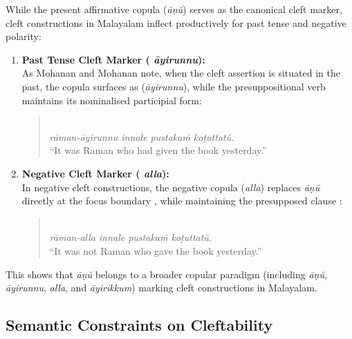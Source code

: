 While the present affirmative copula  (\textit{āṇŭ}) serves as the canonical cleft marker, cleft constructions in Malayalam inflect productively for past tense and negative polarity:
\begin{enumerate}[label=\textbf{\arabic*.}]
    \item \textbf{Past Tense Cleft Marker ( \textit{āyirunnu}):}\\
    As Mohanan and Mohanan \citep[fn.~3]{mohanan1999two} note, when the cleft assertion is situated in the past, the copula surfaces as  (\textit{āyirunnu}), while the presuppositional verb maintains its nominalised participial form:
    \begin{quote}
    \\
    \textit{rāman-āyirunnu innale pustakaṁ koṭuttatŭ.}\\
    ``It was Raman who had given the book yesterday.''
    \end{quote}

    \item \textbf{Negative Cleft Marker ( \textit{alla}):}\\
    In negative cleft constructions, the negative copula  (\textit{alla}) replaces \textit{āṇŭ} directly at the focus boundary \citep[fn.~9]{jayaseelan2023dravidian}, while maintaining the presupposed clause \citep{mohanan1999two}:
    \begin{quote}
    \\
    \textit{rāman-alla innale pustakaṁ koṭuttatŭ.}\\
    ``It was not Raman who gave the book yesterday.''
    \end{quote}
\end{enumerate}
This shows that \textit{āṇŭ} belongs to a broader copular paradigm (including \textit{āṇŭ}, \textit{āyirunnu}, \textit{alla}, and \textit{āyirikkum}) marking cleft constructions in Malayalam.

\subsection{Semantic Constraints on Cleftability}
\label{sec:specificity_constraints}

